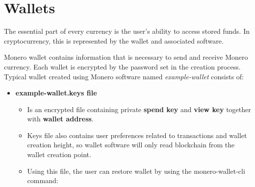 \documentclass[
  printed, %
  table,   %
  nolof,     %
  nolot,     %
           oneside, color
]{fithesis3}
\begin{document}
\section{Wallets}
\label{sec:wallets}
The essential part of every currency is the user's ability to access stored funds. In cryptocurrency, this is represented by the wallet and associated software.

Monero wallet contains information that is necessary to send and receive Monero currency. Each wallet is encrypted by the password set in the creation process. Typical wallet created using Monero software named \textit{example-wallet} consists of:
\begin{itemize}\itemsep0em
\item \textbf{example-wallet.keys file}
\begin{itemize}\itemsep0em
\item Is an encrypted file containing private \textbf{spend key} and \textbf{view key} together with \textbf{wallet address}.
\item Keys file also contains user preferences related to transactions and wallet creation height, so wallet software will only read blockchain from the wallet creation point.
\item Using this file, the user can restore wallet by using the monero-wallet-cli command:


\end{itemize}
\end{itemize}
\end{document}
